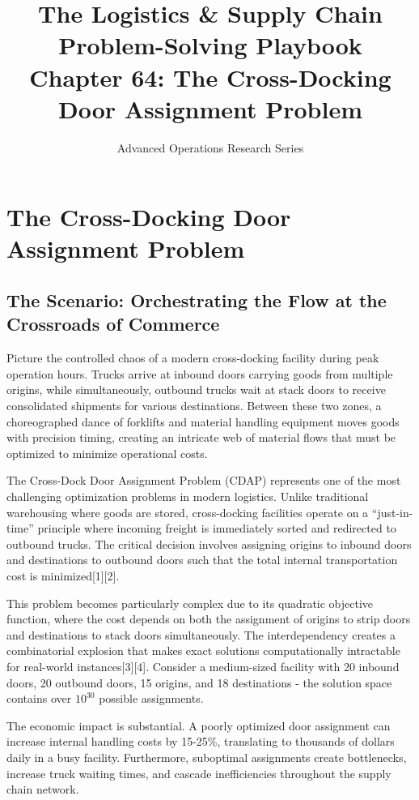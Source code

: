 \documentclass{article}
\title{The Logistics \& Supply Chain Problem-Solving Playbook\\
Chapter 64: The Cross-Docking Door Assignment Problem}
\author{Advanced Operations Research Series}
\date{}
\begin{document}
\maketitle

\section{The Cross-Docking Door Assignment Problem}

\subsection{The Scenario: Orchestrating the Flow at the Crossroads of Commerce}

Picture the controlled chaos of a modern cross-docking facility during peak operation hours. Trucks arrive at inbound doors carrying goods from multiple origins, while simultaneously, outbound trucks wait at stack doors to receive consolidated shipments for various destinations. Between these two zones, a choreographed dance of forklifts and material handling equipment moves goods with precision timing, creating an intricate web of material flows that must be optimized to minimize operational costs.

The Cross-Dock Door Assignment Problem (CDAP) represents one of the most challenging optimization problems in modern logistics. Unlike traditional warehousing where goods are stored, cross-docking facilities operate on a ``just-in-time'' principle where incoming freight is immediately sorted and redirected to outbound trucks. The critical decision involves assigning origins to inbound doors and destinations to outbound doors such that the total internal transportation cost is minimized[1][2].

This problem becomes particularly complex due to its quadratic objective function, where the cost depends on both the assignment of origins to strip doors and destinations to stack doors simultaneously. The interdependency creates a combinatorial explosion that makes exact solutions computationally intractable for real-world instances[3][4]. Consider a medium-sized facility with 20 inbound doors, 20 outbound doors, 15 origins, and 18 destinations - the solution space contains over $10^{30}$ possible assignments.

The economic impact is substantial. A poorly optimized door assignment can increase internal handling costs by 15-25\%, translating to thousands of dollars daily in a busy facility. Furthermore, suboptimal assignments create bottlenecks, increase truck waiting times, and cascade inefficiencies throughout the supply chain network.
\end{document}
